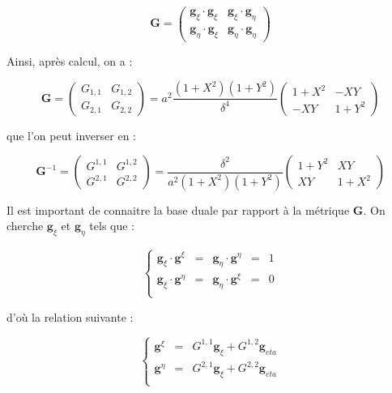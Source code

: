 \begin{equation}
\mathbf{G} = \begin{pmatrix}
\mathbf{g}_{\xi} \cdot \mathbf{g}_{\xi} & \mathbf{g}_{\xi} \cdot \mathbf{g}_{\eta} \\
\mathbf{g}_{\eta} \cdot \mathbf{g}_{\xi} & \mathbf{g}_{\eta} \cdot \mathbf{g}_{\eta}
\end{pmatrix}
\end{equation}

Ainsi, après calcul, on a :

\begin{equation}
\mathbf{G} = \begin{pmatrix}
G_{1,1} & G_{1,2} \\ G_{2,1} & G_{2,2}
\end{pmatrix} = a^2 \dfrac{(1+X^2)(1+Y^2)}{\delta^4} \begin{pmatrix}
1+X^2 & -XY \\ -XY & 1+Y^2
\end{pmatrix}
\end{equation}

que l'on peut inverser en :

\begin{equation}
\mathbf{G}^{-1} = \begin{pmatrix}
G^{1,1} & G^{1,2} \\ G^{2,1} & G^{2,2}
\end{pmatrix} = \dfrac{\delta^2}{a^2 (1+X^2)(1+Y^2)} \begin{pmatrix}
1+Y^2 & XY \\ XY & 1+X^2
\end{pmatrix}
\end{equation}

Il est important de connaitre la base duale par rapport à la métrique $\mathbf{G}$. On cherche $\mathbf{g}_{\xi}$ et $\mathbf{g}_{\eta}$ tels que :

\begin{equation}
\left\lbrace
\begin{array}{rcccl}
\mathbf{g}_{\xi} \cdot \mathbf{g}^{\xi} & = & \mathbf{g}_{\eta} \cdot \mathbf{g}^{\eta} & = & 1 \\
\mathbf{g}_{\xi} \cdot \mathbf{g}^{\eta} & = & \mathbf{g}_{\eta} \cdot \mathbf{g}^{\xi} & = & 0 \\
\end{array}
\right.
\end{equation}

d'où la relation suivante :

\begin{equation}
\left\lbrace
\begin{array}{rcl}
\mathbf{g}^{\xi} & = & G^{1,1} \mathbf{g}_{\xi} + G^{1,2} \mathbf{g}_{eta} \\
\mathbf{g}^{\eta} & = & G^{2,1} \mathbf{g}_{\xi} + G^{2,2} \mathbf{g}_{eta} \\
\end{array}
\right.
\end{equation}

